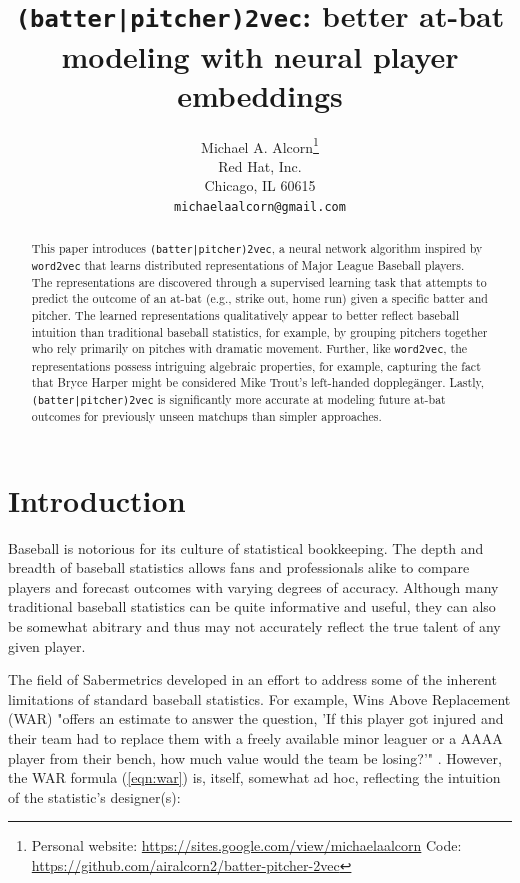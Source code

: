 \documentclass{article}
\title{\texttt{(batter|pitcher)2vec}: better at-bat modeling with neural player embeddings}
\date{}
\author{
    Michael A. Alcorn\thanks
    {Personal website: \url{https://sites.google.com/view/michaelaalcorn}\newline
    \hspace*{1.8em}Code: \url{https://github.com/airalcorn2/batter-pitcher-2vec}} \\
    Red Hat, Inc.\\
    Chicago, IL 60615 \\
    \texttt{michaelaalcorn@gmail.com} \\
}
\begin{document}
\maketitle

\begin{abstract}

This paper introduces \texttt{(batter|pitcher)2vec}, a neural network algorithm inspired by \texttt{word2vec} that learns distributed representations of Major League Baseball players. The representations are discovered through a supervised learning task that attempts to predict the outcome of an at-bat (e.g., strike out, home run) given a specific batter and pitcher. The learned representations qualitatively appear to better reflect baseball intuition than traditional baseball statistics, for example, by grouping pitchers together who rely primarily on pitches with dramatic movement. Further, like \texttt{word2vec}, the representations possess intriguing algebraic properties, for example, capturing the fact that Bryce Harper might be considered Mike Trout's left-handed dopplegänger. Lastly, \texttt{(batter|pitcher)2vec} is significantly more accurate at modeling future at-bat outcomes for previously unseen matchups than simpler approaches.

\end{abstract}

\section{Introduction}

Baseball is notorious for its culture of statistical bookkeeping. The depth and breadth of baseball statistics allows fans and professionals alike to compare players and forecast outcomes with varying degrees of accuracy. Although many traditional baseball statistics can be quite informative and useful, they can also be somewhat abitrary and thus may not accurately reflect the true talent of any given player.

The field of Sabermetrics developed in an effort to address some of the inherent limitations of standard baseball statistics. For example, Wins Above Replacement (WAR) "offers an estimate to answer the question, 'If this player got injured and their team had to replace them with a freely available minor leaguer or a AAAA player from their bench, how much value would the team be losing?'" \parencite{WAR}. However, the WAR formula (\ref{eqn:war}) is, itself, somewhat ad hoc, reflecting the intuition of the statistic's designer(s):
\end{document}
